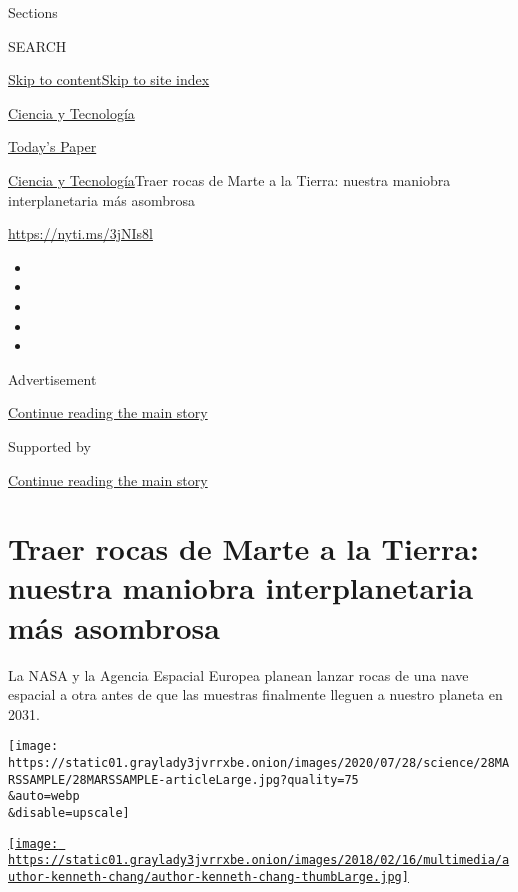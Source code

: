 Sections

SEARCH

\protect\hyperlink{site-content}{Skip to
content}\protect\hyperlink{site-index}{Skip to site index}

\href{https://www.nytimes3xbfgragh.onion/es/section/ciencia-y-tecnologia}{Ciencia
y Tecnología}

\href{https://myaccount.nytimes3xbfgragh.onion/auth/login?response_type=cookie\&client_id=vi}{}

\href{https://www.nytimes3xbfgragh.onion/section/todayspaper}{Today's
Paper}

\href{/es/section/ciencia-y-tecnologia}{Ciencia y
Tecnología}\textbar{}Traer rocas de Marte a la Tierra: nuestra maniobra
interplanetaria más asombrosa

\url{https://nyti.ms/3jNIs8l}

\begin{itemize}
\item
\item
\item
\item
\item
\end{itemize}

Advertisement

\protect\hyperlink{after-top}{Continue reading the main story}

Supported by

\protect\hyperlink{after-sponsor}{Continue reading the main story}

\hypertarget{traer-rocas-de-marte-a-la-tierra-nuestra-maniobra-interplanetaria-muxe1s-asombrosa}{%
\section{Traer rocas de Marte a la Tierra: nuestra maniobra
interplanetaria más
asombrosa}\label{traer-rocas-de-marte-a-la-tierra-nuestra-maniobra-interplanetaria-muxe1s-asombrosa}}

La NASA y la Agencia Espacial Europea planean lanzar rocas de una nave
espacial a otra antes de que las muestras finalmente lleguen a nuestro
planeta en 2031.

\texttt{[image: https://static01.graylady3jvrrxbe.onion/images/2020/07/28/science/28MARSSAMPLE/28MARSSAMPLE-articleLarge.jpg?quality=75\\\&auto=webp\\\&disable=upscale]}

\href{https://www.nytimes3xbfgragh.onion/by/kenneth-chang}{\texttt{[image: https://static01.graylady3jvrrxbe.onion/images/2018/02/16/multimedia/author-kenneth-chang/author-kenneth-chang-thumbLarge.jpg]}}

